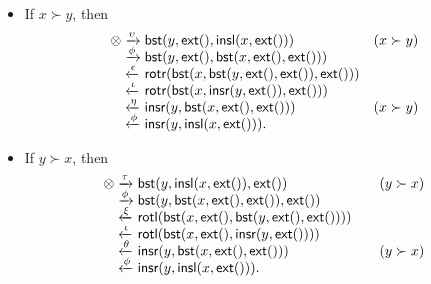 \begin{itemize}

  \item If \(x \succ y\), then
\begin{equation*}
\begin{array}{@{}r@{\;}l@{\;}l@{\quad}r@{}}
\otimes
& \xrightarrow{\smash{\upsilon}} & 
  \fun{bst}(y,\fun{ext}(),\fun{insl}(x,\fun{ext}()))
& (x \succ y)\\
& \xrightarrow{\smash{\phi}} &
  \fun{bst}(y,\fun{ext}(),\fun{bst}(x,\fun{ext}(),\fun{ext}()))\\
& \xleftarrow{\smash{\epsilon}} &
\fun{rotr}(\fun{bst}(x,\fun{bst}(y,\fun{ext}(),\fun{ext}()),\fun{ext}()))\\
& \xleftarrow{\smash{\iota}} &
  \fun{rotr}(\fun{bst}(x,\fun{insr}(y,\fun{ext}()),\fun{ext}()))\\
& \xleftarrow{\smash{\eta}} &
  \fun{insr}(y,\fun{bst}(x,\fun{ext}(),\fun{ext}()))
& (x \succ y)\\
& \xleftarrow{\smash{\phi}} &
  \fun{insr}(y,\fun{insl}(x,\fun{ext}())).
\end{array}
\end{equation*}

  \item If \(y \succ x\), then
\begin{equation*}
\begin{array}{@{}r@{\;}l@{\;}l@{\qquad}r@{}}
\otimes & \xrightarrow{\smash{\tau}} &
  \fun{bst}(y,\fun{insl}(x,\fun{ext}()),\fun{ext}())
& (y \succ x)\\
& \xrightarrow{\smash{\phi}} &
  \fun{bst}(y,\fun{bst}(x,\fun{ext}(),\fun{ext}()),\fun{ext}())\\
& \xleftarrow{\smash{\xi}} &
\fun{rotl}(\fun{bst}(x,\fun{ext}(),\fun{bst}(y,\fun{ext}(),\fun{ext}())))\\
& \xleftarrow{\smash{\iota}} &
  \fun{rotl}(\fun{bst}(x,\fun{ext}(),\fun{insr}(y,\fun{ext}())))\\
& \xleftarrow{\smash{\theta}} &
  \fun{insr}(y,\fun{bst}(x,\fun{ext}(),\fun{ext}()))
& (y \succ x)\\
& \xleftarrow{\smash{\phi}} &
  \fun{insr}(y,\fun{insl}(x,\fun{ext}())).
\end{array}
\end{equation*}
\end{itemize}

